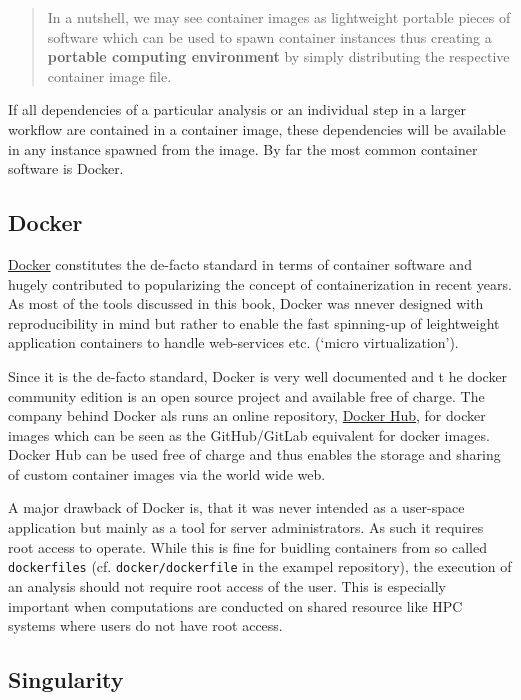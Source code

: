 \documentclass[]{book}
\begin{document}
\begin{quote}
In a nutshell, we may see container images as lightweight portable
pieces of software which can be used to spawn container instances thus
creating a \textbf{portable computing environment} by simply
distributing the respective container image file.
\end{quote}

If all dependencies of a particular analysis or an individual step in a
larger workflow are contained in a container image, these dependencies
will be available in any instance spawned from the image. By far the
most common container software is Docker.

\subsection{Docker}\label{sct-docker}

\href{https://www.docker.com/}{Docker} constitutes the de-facto standard
in terms of container software and hugely contributed to popularizing
the concept of containerization in recent years. As most of the tools
discussed in this book, Docker was nnever designed with reproducibility
in mind but rather to enable the fast spinning-up of leightweight
application containers to handle web-services etc. (`micro
virtualization').

Since it is the de-facto standard, Docker is very well documented and t
he docker community edition is an open source project and available free
of charge. The company behind Docker als runs an online repository,
\href{https://www.docker.com/products/docker-hub}{Docker Hub}, for
docker images which can be seen as the GitHub/GitLab equivalent for
docker images. Docker Hub can be used free of charge and thus enables
the storage and sharing of custom container images via the world wide
web.

A major drawback of Docker is, that it was never intended as a
user-space application but mainly as a tool for server administrators.
As such it requires root access to operate. While this is fine for
buidling containers from so called \texttt{dockerfiles} (cf.
\texttt{docker/dockerfile} in the exampel repository), the execution of
an analysis should not require root access of the user. This is
especially important when computations are conducted on shared resource
like HPC systems where users do not have root access.

\subsection{Singularity}\label{singularity}
\end{document}
